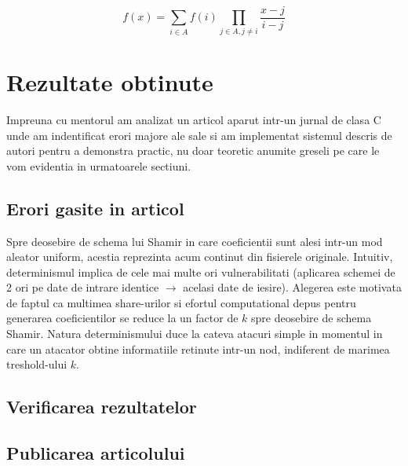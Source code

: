\documentclass{llncs}
\begin{document}
\begin{equation}
	f(x)=\sum_{i \in A} f(i) \prod_{j \in A, j \neq i} \frac{x-j}{i-j}
\end{equation}

\section{Rezultate obtinute}
Impreuna cu mentorul am analizat un articol aparut intr-un jurnal de clasa C unde am indentificat erori majore ale sale si am implementat sistemul descris de autori pentru a demonstra practic, nu doar teoretic anumite greseli pe care le vom evidentia in urmatoarele sectiuni. \cite{AAMK:2013}

\label{sec:results}
\subsection{Erori gasite in articol}


Spre deosebire de schema lui Shamir in care coeficientii sunt alesi intr-un mod aleator uniform, acestia
reprezinta acum continut din fisierele originale.
Intuitiv, determinismul implica de cele mai multe ori vulnerabilitati (aplicarea schemei de 2 ori pe date de intrare identice $\rightarrow$ acelasi date de iesire).
Alegerea este motivata de faptul ca multimea share-urilor si efortul computational depus pentru generarea coeficientilor se reduce la un factor de $k$ spre deosebire de schema Shamir. Natura determinismului duce la cateva atacuri simple in momentul in care un atacator obtine informatiile retinute intr-un nod, indiferent de marimea treshold-ului $k$.


\subsection{Verificarea rezultatelor}
\subsection{Publicarea articolului}

%
%
%



\end{document}
